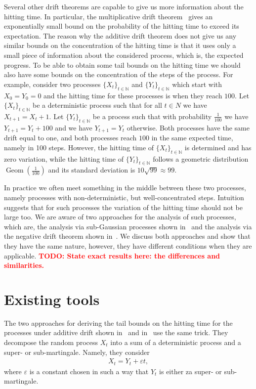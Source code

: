\documentclass[12pt, a4paper]{article}
\theoremstyle{remark}
\newcommand{\N}{{\mathbb N}}
\newcommand{\eps}{\varepsilon}
\newcommand{\todo}[1]{\textbf{\textcolor{red}{TODO: #1}}}
\DeclareMathOperator{\Geom}{Geom}
\begin{document}
Several other drift theorems are capable to give us more information about the hitting time. In particular, the multiplicative drift theorem~\cite{DoerrJW12} gives an exponentially small bound on the probability of the hitting time to exceed its expectation. The reason why the additive drift theorem does not give us any similar bounds on the concentration of the hitting time is that it uses only a small piece of information about the considered process, which is, the expected progress. To be able to obtain some tail bounds on the hitting time we should also have some bounds on the concentration of the steps of the process. For example, consider two processes $\{X_t\}_{t \in \N}$ and $\{Y_t\}_{t \in \N}$ which start with $X_0 = Y_0 = 0$ and the hitting time for these processes is when they reach $100$. Let $\{X_t\}_{t \in \N}$ be a deterministic process such that for all $t \in N$ we have $X_{t + 1} = X_t + 1$. Let $\{Y_t\}_{t \in \N}$ be a process such that with probability $\frac{1}{100}$ we have $Y_{t + 1} = Y_t + 100$ and we have $Y_{t + 1} = Y_t$ otherwise. Both processes have the same drift equal to one, and both processes reach $100$ in the same expected time, namely in 100 steps. However, the hitting time of $\{X_t\}_{t \in \N}$ is determined and has zero variation, while the hitting time of $\{Y_t\}_{t \in \N}$ follows a geometric distribution $\Geom(\frac{1}{100})$ and its standard deviation is $10\sqrt{99} \approx 99$.

In practice we often meet something in the middle between these two processes, namely processes with non-deterministic, but well-concentrated steps. Intuition suggests that for such processes the variation of the hitting time should not be large too. We are aware of two approaches for the analysis of such processes, which are, the analysis via sub-Gaussian processes shown in~\cite{Kotzing16} and the analysis via the negative drift theorem shown in~\cite{AntipovDK19}. We discuss both approaches and show that they have the same nature, however, they have different conditions when they are applicable. \todo{State exact results here: the differences and similarities.}

\section{Existing tools}

The two approaches for deriving the tail bounds on the hitting time for the processes under additive drift shown in~\cite{Kotzing16} and in~\cite{AntipovDK19} use the same trick. They decompose the random process $X_t$ into a sum of a deterministic process and a super- or sub-martingale. Namely, they consider
\begin{align*}
    X_t = Y_t + \eps t,
\end{align*}
where $\eps$ is a constant chosen in such a way that $Y_t$ is either za super- or sub-martingale.
\end{document}
